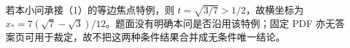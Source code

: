 \begin{answer}
若本小问承接（1）的等边焦点特例，则 $t=\sqrt{3/7}>1/2$，故横坐标为 $x_*=7(\sqrt7-\sqrt3)/12$。题面没有明确本问是否沿用该特例；固定 PDF 亦无答案页可用于裁定，故不把这两种条件结果合并成无条件唯一结论。




\end{answer}